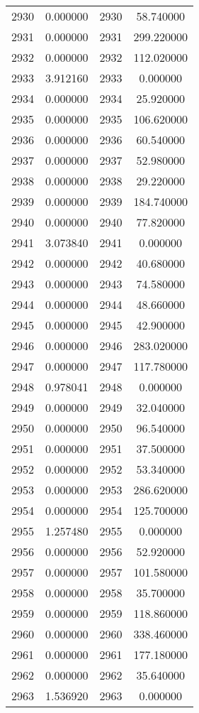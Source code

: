 \documentclass[12pt]{article}
\begin{document}
\begin{longtable}{@{}cccc@{}}
2930 & 0.000000 & 2930 & 58.740000 \\
2931 & 0.000000 & 2931 & 299.220000 \\
2932 & 0.000000 & 2932 & 112.020000 \\
2933 & 3.912160 & 2933 & 0.000000 \\
2934 & 0.000000 & 2934 & 25.920000 \\
2935 & 0.000000 & 2935 & 106.620000 \\
2936 & 0.000000 & 2936 & 60.540000 \\
2937 & 0.000000 & 2937 & 52.980000 \\
2938 & 0.000000 & 2938 & 29.220000 \\
2939 & 0.000000 & 2939 & 184.740000 \\
2940 & 0.000000 & 2940 & 77.820000 \\
2941 & 3.073840 & 2941 & 0.000000 \\
2942 & 0.000000 & 2942 & 40.680000 \\
2943 & 0.000000 & 2943 & 74.580000 \\
2944 & 0.000000 & 2944 & 48.660000 \\
2945 & 0.000000 & 2945 & 42.900000 \\
2946 & 0.000000 & 2946 & 283.020000 \\
2947 & 0.000000 & 2947 & 117.780000 \\
2948 & 0.978041 & 2948 & 0.000000 \\
2949 & 0.000000 & 2949 & 32.040000 \\
2950 & 0.000000 & 2950 & 96.540000 \\
2951 & 0.000000 & 2951 & 37.500000 \\
2952 & 0.000000 & 2952 & 53.340000 \\
2953 & 0.000000 & 2953 & 286.620000 \\
2954 & 0.000000 & 2954 & 125.700000 \\
2955 & 1.257480 & 2955 & 0.000000 \\
2956 & 0.000000 & 2956 & 52.920000 \\
2957 & 0.000000 & 2957 & 101.580000 \\
2958 & 0.000000 & 2958 & 35.700000 \\
2959 & 0.000000 & 2959 & 118.860000 \\
2960 & 0.000000 & 2960 & 338.460000 \\
2961 & 0.000000 & 2961 & 177.180000 \\
2962 & 0.000000 & 2962 & 35.640000 \\
2963 & 1.536920 & 2963 & 0.000000 \\

\end{longtable}
\end{document}
